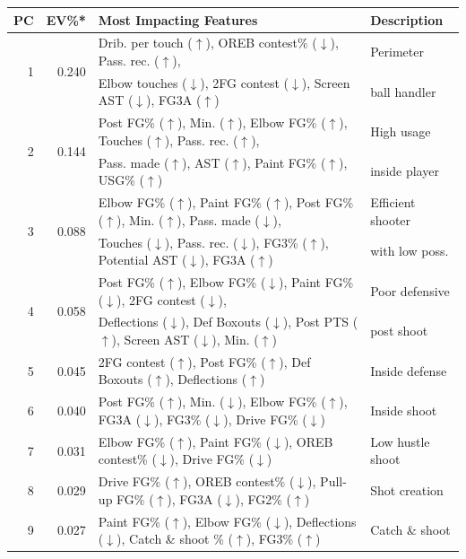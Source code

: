 \begin{tabular}{rrll}
\toprule
PC & EV\%* & Most Impacting Features & Description \\
\midrule
\multirow{2}{*}{1} & \multirow{2}{*}{0.240} & Drib. per touch ($\uparrow$), OREB contest\% ($\downarrow$), Pass. rec. ($\uparrow$), & Perimeter \\
& & Elbow touches ($\downarrow$), 2FG contest ($\downarrow$), Screen AST ($\downarrow$), FG3A ($\uparrow$) & ball handler \\
\midrule
\multirow{2}{*}{2} & \multirow{2}{*}{0.144} & Post FG\% ($\uparrow$), Min. ($\uparrow$), Elbow FG\% ($\uparrow$), Touches ($\uparrow$), Pass. rec. ($\uparrow$), & High usage \\
& & Pass. made ($\uparrow$), AST ($\uparrow$), Paint FG\% ($\uparrow$), USG\% ($\uparrow$) & inside player \\
\midrule
\multirow{2}{*}{3} & \multirow{2}{*}{0.088} & Elbow FG\% ($\uparrow$), Paint FG\% ($\uparrow$), Post FG\% ($\uparrow$), Min. ($\uparrow$), Pass. made ($\downarrow$), & Efficient shooter \\
& & Touches ($\downarrow$), Pass. rec. ($\downarrow$), FG3\% ($\uparrow$), Potential AST ($\downarrow$), FG3A ($\uparrow$) & with low poss. \\
\midrule
\multirow{2}{*}{4} & \multirow{2}{*}{0.058} & Post FG\% ($\uparrow$), Elbow FG\% ($\downarrow$), Paint FG\% ($\downarrow$), 2FG contest ($\downarrow$), & Poor defensive \\
& & Deflections ($\downarrow$), Def Boxouts ($\downarrow$), Post PTS ($\uparrow$), Screen AST ($\downarrow$), Min. ($\uparrow$) & post shoot \\ 
\midrule
5 & 0.045 & 2FG contest ($\uparrow$), Post FG\% ($\uparrow$), Def Boxouts ($\uparrow$), Deflections ($\uparrow$) & Inside defense \\ 
\midrule
6 & 0.040 & Post FG\% ($\uparrow$), Min. ($\downarrow$), Elbow FG\% ($\uparrow$), FG3A ($\downarrow$), FG3\% ($\downarrow$), Drive FG\% ($\downarrow$) & Inside shoot \\ 
\midrule
7 & 0.031 & Elbow FG\% ($\uparrow$), Paint FG\% ($\downarrow$), OREB contest\% ($\downarrow$), Drive FG\% ($\downarrow$) & Low hustle shoot \\ 
\midrule
8 & 0.029 & Drive FG\% ($\uparrow$), OREB contest\% ($\downarrow$), Pull-up FG\% ($\uparrow$), FG3A ($\downarrow$), FG2\% ($\uparrow$) & Shot creation \\ 
\midrule
9 & 0.027 & Paint FG\% ($\uparrow$), Elbow FG\% ($\downarrow$), Deflections ($\downarrow$), Catch \& shoot \% ($\uparrow$), FG3\% ($\uparrow$) & Catch \& shoot \\ 

\end{tabular}

